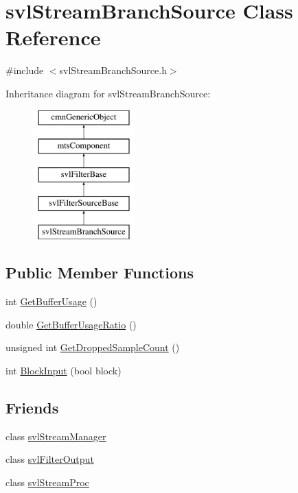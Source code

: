 \hypertarget{classsvl_stream_branch_source}{}\section{svl\+Stream\+Branch\+Source Class Reference}
\label{classsvl_stream_branch_source}


{\ttfamily \#include $<$svl\+Stream\+Branch\+Source.\+h$>$}

Inheritance diagram for svl\+Stream\+Branch\+Source\+:\begin{figure}[H]
\begin{center}
\leavevmode
\includegraphics[height=5.000000cm]{d1/d79/classsvl_stream_branch_source}
\end{center}
\end{figure}
\subsection*{Public Member Functions}
\begin{DoxyCompactItemize}
\item 
int \hyperlink{classsvl_stream_branch_source_a889d5b782862d6571235050785b688e0}{Get\+Buffer\+Usage} ()
\item 
double \hyperlink{classsvl_stream_branch_source_a15d0b0c4c9693228f39489c2faec21cf}{Get\+Buffer\+Usage\+Ratio} ()
\item 
unsigned int \hyperlink{classsvl_stream_branch_source_a3f828232886b81521a2e742e3f0d01da}{Get\+Dropped\+Sample\+Count} ()
\item 
int \hyperlink{classsvl_stream_branch_source_ae1d4a50f0c26fe04e7e0ffdf35358794}{Block\+Input} (bool block)
\end{DoxyCompactItemize}
\subsection*{Friends}
\begin{DoxyCompactItemize}
\item 
class \hyperlink{classsvl_stream_branch_source_ab5eee58544f2ce644140e932afbe32db}{svl\+Stream\+Manager}
\item 
class \hyperlink{classsvl_stream_branch_source_a3f45c3511fc124d190c8ffb5953025f6}{svl\+Filter\+Output}
\item 
class \hyperlink{classsvl_stream_branch_source_a6a9ee1dec5ca263793dca09411295245}{svl\+Stream\+Proc}
\end{DoxyCompactItemize}
